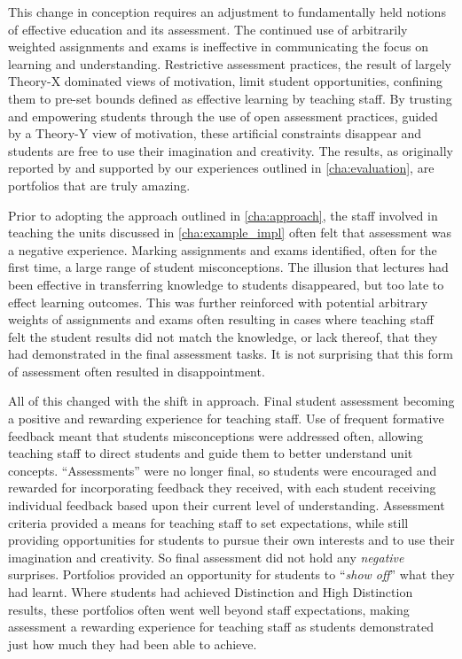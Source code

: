 This change in conception requires an adjustment to fundamentally held notions of effective education and its assessment. The continued use of arbitrarily weighted assignments and exams is ineffective in communicating the focus on learning and understanding. Restrictive assessment practices, the result of largely Theory-X dominated views of motivation, limit student opportunities, confining them to pre-set bounds defined as effective learning by teaching staff. By trusting and empowering students through the use of open assessment practices, guided by a Theory-Y view of motivation, these artificial constraints disappear and students are free to use their imagination and creativity. The results, as originally reported by \citet{Biggs:2007} and supported by our experiences outlined in \cref{cha:evaluation}, are portfolios that are truly amazing. 

Prior to adopting the approach outlined in \cref{cha:approach}, the staff involved in teaching the units discussed in \cref{cha:example_impl} often felt that assessment was a negative experience. Marking assignments and exams identified, often for the first time, a large range of student misconceptions. The illusion that lectures had been effective in transferring knowledge to students disappeared, but too late to effect learning outcomes. This was further reinforced with potential arbitrary weights of assignments and exams often resulting in cases where teaching staff felt the student results did not match the knowledge, or lack thereof, that they had demonstrated in the final assessment tasks. It is not surprising that this form of assessment often resulted in disappointment.

All of this changed with the shift in approach. Final student assessment becoming a positive and rewarding experience for teaching staff. Use of frequent formative feedback meant that students misconceptions were addressed often, allowing teaching staff to direct students and guide them to better understand unit concepts. ``Assessments'' were no longer final, so students were encouraged and rewarded for incorporating feedback they received, with each student receiving individual feedback based upon their current level of understanding. Assessment criteria provided a means for teaching staff to set expectations, while still providing opportunities for students to pursue their own interests and to use their imagination and creativity. So final assessment did not hold any \emph{negative} surprises. Portfolios provided an opportunity for students to ``\emph{show off}'' what they had learnt. Where students had achieved Distinction and High Distinction results, these portfolios often went well beyond staff expectations, making assessment a rewarding experience for teaching staff as students demonstrated just how much they had been able to achieve.

